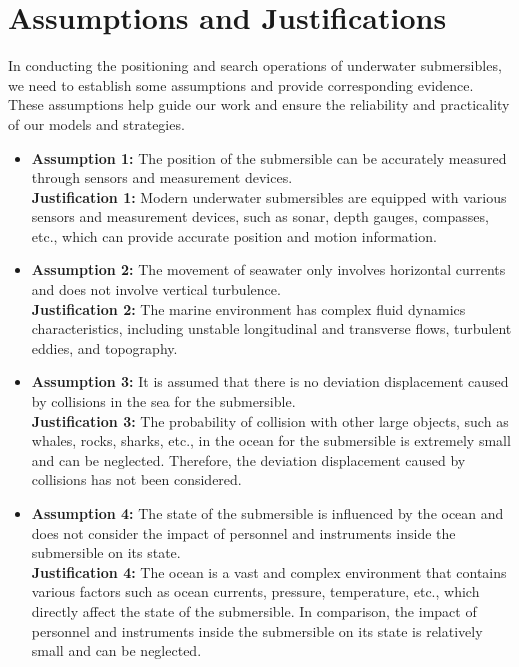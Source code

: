 \documentclass[12pt]{article}
\begin{document}
\section{Assumptions and Justifications}

In conducting the positioning and search operations of underwater submersibles, we need to establish some assumptions and provide corresponding evidence. These assumptions help guide our work and ensure the reliability and practicality of our models and strategies.

\begin{itemize}
    \item \textbf{Assumption 1:} The position of the submersible can be accurately measured through sensors and measurement devices.  \\
          \textbf{Justification 1:} Modern underwater submersibles are equipped with various sensors and measurement devices, such as sonar, depth gauges, compasses, etc., which can provide accurate position and motion information.

    \item \textbf{Assumption 2:}  The movement of seawater only involves horizontal currents and does not involve vertical turbulence. \\
          \textbf{Justification 2:} The marine environment has complex fluid dynamics characteristics, including unstable longitudinal and transverse flows, turbulent eddies, and topography.

    \item \textbf{Assumption 3:} It is assumed that there is no deviation displacement caused by collisions in the sea for the submersible. \\
          \textbf{Justification 3:} The probability of collision with other large objects, such as whales, rocks, sharks, etc., in the ocean for the submersible is extremely small and can be neglected. Therefore, the deviation displacement caused by collisions has not been considered.

    \item \textbf{Assumption 4:} The state of the submersible is influenced by the ocean and does not consider the impact of personnel and instruments inside the submersible on its state.\\
          \textbf{Justification 4:} The ocean is a vast and complex environment that contains various factors such as ocean currents, pressure, temperature, etc., which directly affect the state of the submersible. In comparison, the impact of personnel and instruments inside the submersible on its state is relatively small and can be neglected.
\end{itemize}
\end{document}
